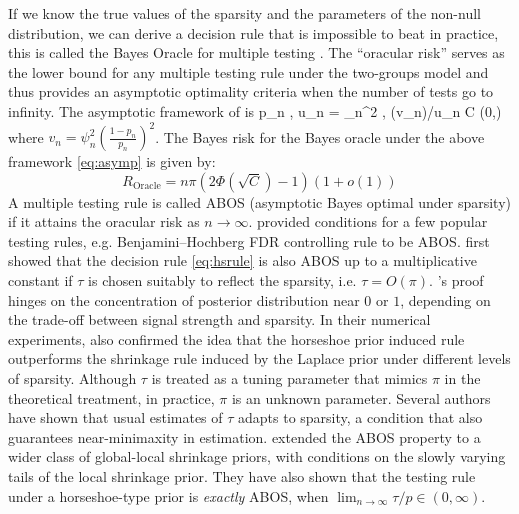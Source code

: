 \documentclass[11pt]{article}
\begin{document}
If we know the true values of the sparsity and the parameters of the non-null distribution, we can derive a decision rule that is impossible to beat in practice, this is called the Bayes Oracle for multiple testing \citep{bogdan2011asymptotic}. The ``oracular risk'' serves as the lower bound for any multiple testing rule under the two-groups model and thus provides an asymptotic optimality criteria when the number of tests go to infinity. The asymptotic framework of \citet{bogdan2011asymptotic} is 
\beq
p_n , \; u_n = \psi_n^2 \to \infty, \;  \; \log(v_n)/u_n \to C \in (0,\infty) \label{eq:asymp}
\eeq
where $v_n = \psi_n^2 (\frac{1-p_n}{p_n})^2$. The Bayes risk for the Bayes oracle under the above framework \eqref{eq:asymp} is given by:
\[
R_{\text{Oracle}} = n \pi (2 \Phi(\sqrt{C}) - 1)(1+o(1))
\]
A multiple testing rule is called ABOS (asymptotic Bayes optimal under sparsity) if it attains the oracular risk as $n \to \infty$. \citet{bogdan2011asymptotic} provided conditions for a few popular testing rules, e.g. Benjamini--Hochberg FDR controlling rule to be ABOS. \citet{datta2013asymptotic} first showed that the decision rule \eqref{eq:hsrule} is also ABOS up to a multiplicative constant if $\tau$ is chosen suitably to reflect the sparsity, i.e. $\tau = O(\pi)$. \citet{datta2013asymptotic}'s proof hinges on the concentration of posterior distribution near $0$ or $1$, depending on the trade-off between signal strength and sparsity. In their numerical experiments, \citet{datta2013asymptotic} also confirmed the idea that the horseshoe prior induced rule outperforms the shrinkage rule induced by the Laplace prior under different levels of sparsity. 
Although $\tau$ is treated as a tuning parameter that mimics $\pi$ in the theoretical treatment, in practice, $\pi$ is an unknown parameter. Several authors \cite{datta2013asymptotic, ghosh2016asymptotic, ghosh2016testing,van2016many} have shown that usual estimates of $\tau$ adapts to sparsity, a condition that also guarantees near-minimaxity in estimation. \citet{ghosh2016testing} extended the ABOS property to a wider class of global-local shrinkage priors, with conditions on the slowly varying tails of the local shrinkage prior. They have also shown that the testing rule under a horseshoe-type prior is \textit{exactly} ABOS, when $\lim_{n \to \infty} \tau/p \in (0, \infty)$. 


\end{document}
